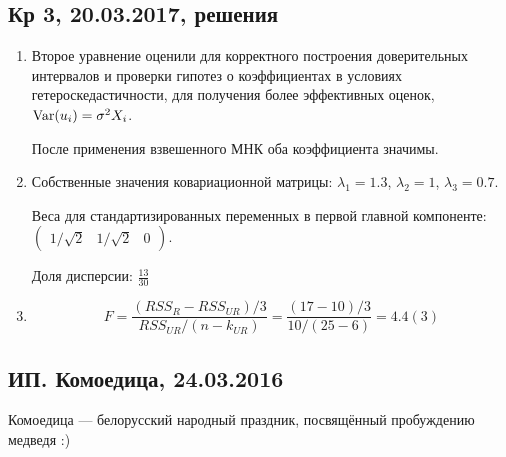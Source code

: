 \documentclass[12pt, a4paper]{article}
\theoremstyle{definition}
\begin{document}
\subsection{Кр 3, 20.03.2017, решения}
\begin{enumerate}
  \item Второе уравнение оценили для корректного построения доверительных интервалов и проверки гипотез о коэффициентах в условиях гетероскедастичности, для получения более эффективных оценок, $\operatorname{Var}(u_i)=\sigma^2 X_i$.

  После применения взвешенного МНК оба коэффициента значимы.
  \item

Собственные значения ковариационной матрицы: $\lambda_1 = 1.3$, $\lambda_2 = 1$, $\lambda_3 = 0.7$.

Веса для стандартизированных переменных в первой главной компоненте: $\begin{pmatrix}
  1/\sqrt{2} & 1/\sqrt{2} & 0 
\end{pmatrix}$.

Доля дисперсии: $\frac{13}{30}$

  \item
  \[
  F = \frac{(RSS_R - RSS_{UR})/3}{RSS_{UR}/(n-k_{UR})}= \frac{(17-10)/3}{10/(25-6)} = 4.4(3)
  \]

\end{enumerate}



\subsection{ИП. Комоедица, 24.03.2016}


Комоедица — белорусский народный праздник, посвящённый пробуждению медведя :)
\end{document}
